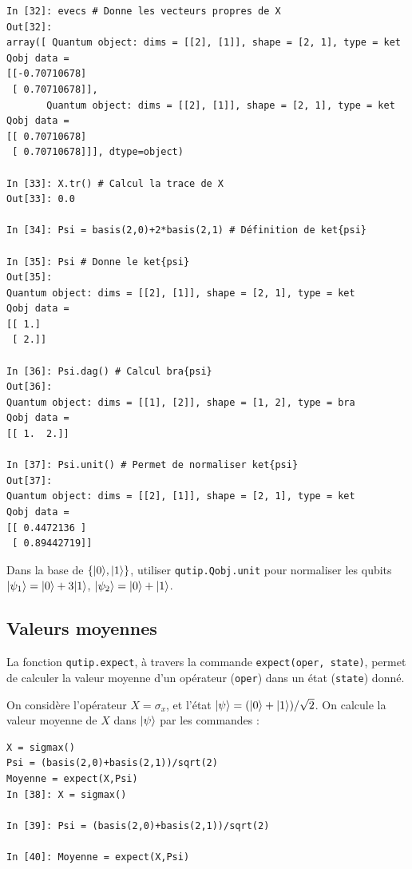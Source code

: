 \begin{itemize}
\begin{example}
\begin{lstlisting}
In [32]: evecs # Donne les vecteurs propres de X
Out[32]: 
array([ Quantum object: dims = [[2], [1]], shape = [2, 1], type = ket
Qobj data =
[[-0.70710678]
 [ 0.70710678]],
       Quantum object: dims = [[2], [1]], shape = [2, 1], type = ket
Qobj data =
[[ 0.70710678]
 [ 0.70710678]]], dtype=object)

In [33]: X.tr() # Calcul la trace de X
Out[33]: 0.0

In [34]: Psi = basis(2,0)+2*basis(2,1) # Définition de ket{psi}

In [35]: Psi # Donne le ket{psi}
Out[35]: 
Quantum object: dims = [[2], [1]], shape = [2, 1], type = ket
Qobj data =
[[ 1.]
 [ 2.]]
 
In [36]: Psi.dag() # Calcul bra{psi}
Out[36]: 
Quantum object: dims = [[1], [2]], shape = [1, 2], type = bra
Qobj data =
[[ 1.  2.]]

In [37]: Psi.unit() # Permet de normaliser ket{psi}
Out[37]: 
Quantum object: dims = [[2], [1]], shape = [2, 1], type = ket
Qobj data =
[[ 0.4472136 ]
 [ 0.89442719]]
\end{lstlisting}
\end{example}

\begin{exercise}
Dans la base de $\{\vert0\rangle,\vert1\rangle\}$, utiliser \texttt{qutip.Qobj.unit} pour
normaliser les qubits $\vert\psi_1\rangle=\vert0\rangle+3\vert1\rangle$, 
$\vert\psi_2\rangle=\vert0\rangle+\vert1\rangle$.
\end{exercise}

\subsection{Valeurs moyennes}

La fonction \texttt{qutip.expect}, à travers la commande \texttt{expect(oper, 
state)}, permet de calculer la valeur moyenne d'un opérateur (\texttt{oper}) 
dans un état (\texttt{state}) donné. 

\begin{example}
On considère l'opérateur $X=\sigma_x$, et l'état 
$\vert\psi\rangle=(\vert0\rangle+\vert1\rangle)/\sqrt{2}$. On calcule la valeur moyenne de $X$ 
dans $\vert\psi\rangle$ par les commandes :\\
\begin{lstlisting}
X = sigmax()
Psi = (basis(2,0)+basis(2,1))/sqrt(2)
Moyenne = expect(X,Psi)
In [38]: X = sigmax()

In [39]: Psi = (basis(2,0)+basis(2,1))/sqrt(2)

In [40]: Moyenne = expect(X,Psi)


\end{lstlisting}
\end{example}
\end{itemize}
